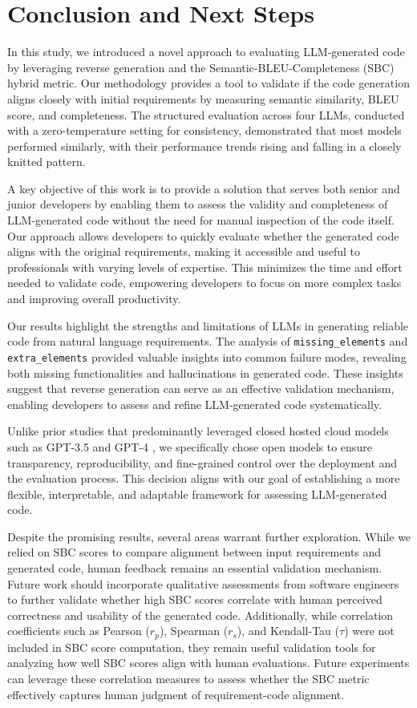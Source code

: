 \documentclass{article}
\begin{document}
\section{Conclusion and Next Steps}  
In this study, we introduced a novel approach to evaluating LLM-generated code by leveraging reverse generation and the Semantic-BLEU-Completeness (SBC) hybrid metric. Our methodology provides a tool to validate if the  code generation aligns closely with initial requirements by measuring semantic similarity, BLEU score, and completeness. The structured evaluation across four LLMs, conducted with a zero-temperature setting for consistency, demonstrated that most models performed similarly, with their performance trends rising and falling in a closely knitted pattern.  

A key objective of this work is to provide a solution that serves both senior and junior developers by enabling them to assess the validity and completeness of LLM-generated code without the need for manual inspection of the code itself. Our approach allows developers to quickly evaluate whether the generated code aligns with the original requirements, making it accessible and useful to professionals with varying levels of expertise. This minimizes the time and effort needed to validate code, empowering developers to focus on more complex tasks and improving overall productivity.  

Our results highlight the strengths and limitations of LLMs in generating reliable code from natural language requirements. The analysis of \texttt{missing\_elements} and \texttt{extra\_elements} provided valuable insights into common failure modes, revealing both missing functionalities and hallucinations in generated code. These insights suggest that reverse generation can serve as an effective validation mechanism, enabling developers to assess and refine LLM-generated code systematically.  

Unlike prior studies that predominantly leveraged closed hosted cloud models such as GPT-3.5 and GPT-4 \cite{terry2024icescore, yang2023geval}, we specifically chose open models to ensure transparency, reproducibility, and fine-grained control over the deployment and the evaluation process. This decision aligns with our goal of establishing a more flexible, interpretable, and adaptable framework for assessing LLM-generated code.

Despite the promising results, several areas warrant further exploration. While we relied on SBC scores to compare alignment between input requirements and generated code, human feedback remains an essential validation mechanism. Future work should incorporate qualitative assessments from software engineers to further validate whether high SBC scores correlate with human perceived correctness and usability of the generated code. Additionally, while correlation coefficients such as Pearson ($r_p$), Spearman ($r_s$), and Kendall-Tau ($\tau$) were not included in SBC score computation, they remain useful validation tools for analyzing how well SBC scores align with human evaluations. Future experiments can leverage these correlation measures to assess whether the SBC metric effectively captures human judgment of requirement-code alignment.  
\end{document}
